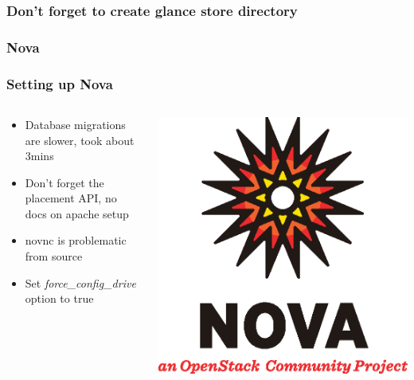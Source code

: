 \documentclass[aspectratio=169,11pt,hyperref={colorlinks=true}]{beamer}
\begin{document}
\begin{frame}
    \frametitle{Don't forget to create glance store directory}
    
\end{frame}

\subsubsection{Nova}
\begin{frame}
    \frametitle{Setting up Nova}
    \begin{columns}[T]
        \begin{column}{.48\textwidth}
            \begin{itemize}
                \item Database migrations are slower, took about 3mins
                \item Don't forget the placement API, no docs on apache setup
                \item novnc is problematic from source
                \item Set \textit{force\_config\_drive} option to true
            \end{itemize}
        \end{column}
        \begin{column}{.48\textwidth}
            \includegraphics[width=\textwidth]{mascots/nova.eps}
        \end{column}
    \end{columns}
\end{frame}
\end{document}
